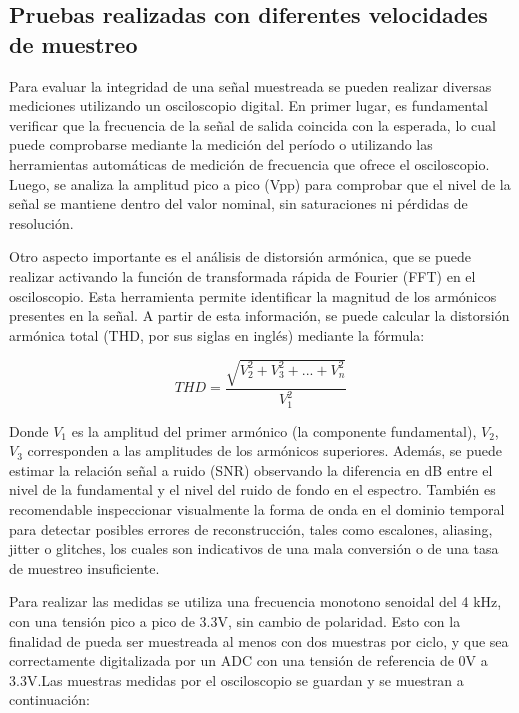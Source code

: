 \documentclass[12pt]{article}
\begin{document}
	\subsection{Pruebas realizadas con diferentes velocidades de muestreo}
	Para evaluar la integridad de una señal muestreada se pueden realizar diversas mediciones utilizando un osciloscopio digital. En primer lugar, es fundamental verificar que la frecuencia de la señal de salida coincida con la esperada, lo cual puede comprobarse mediante la medición del período o utilizando las herramientas automáticas de medición de frecuencia que ofrece el osciloscopio. Luego, se analiza la amplitud pico a pico (Vpp) para comprobar que el nivel de la señal se mantiene dentro del valor nominal, sin saturaciones ni pérdidas de resolución.
	
	Otro aspecto importante es el análisis de distorsión armónica, que se puede realizar activando la función de transformada rápida de Fourier (FFT) en el osciloscopio. Esta herramienta permite identificar la magnitud de los armónicos presentes en la señal. A partir de esta información, se puede calcular la distorsión armónica total (THD, por sus siglas en inglés) mediante la fórmula:
	
	\begin{equation}
		THD = \frac{\sqrt{V_{2}^{2}+V_{3}^{2}+ ... +V_{n}^{2}}}{V_{1}^{2}}
	\end{equation}
	
	Donde $V_{1}$ es la amplitud del primer armónico (la componente fundamental), $V_{2}$, $V_{3}$
	corresponden a las amplitudes de los armónicos superiores.	Además, se puede estimar la relación señal a ruido (SNR) observando la diferencia en dB entre el nivel de la fundamental y el nivel del ruido de fondo en el espectro. También es recomendable inspeccionar visualmente la forma de onda en el dominio temporal para detectar posibles errores de reconstrucción, tales como escalones, aliasing, jitter o glitches, los cuales son indicativos de una mala conversión o de una tasa de muestreo insuficiente.
	\newline
	
	Para realizar las medidas se utiliza una frecuencia monotono senoidal del 4 kHz, con una tensión pico a pico de 3.3V, sin cambio de polaridad. Esto con la finalidad de pueda ser muestreada al menos con dos muestras por ciclo, y que sea correctamente digitalizada por un ADC con una tensión de referencia de 0V a 3.3V.Las muestras medidas por el osciloscopio se guardan y se muestran a  continuación:
	\newpage
	
\end{document}
